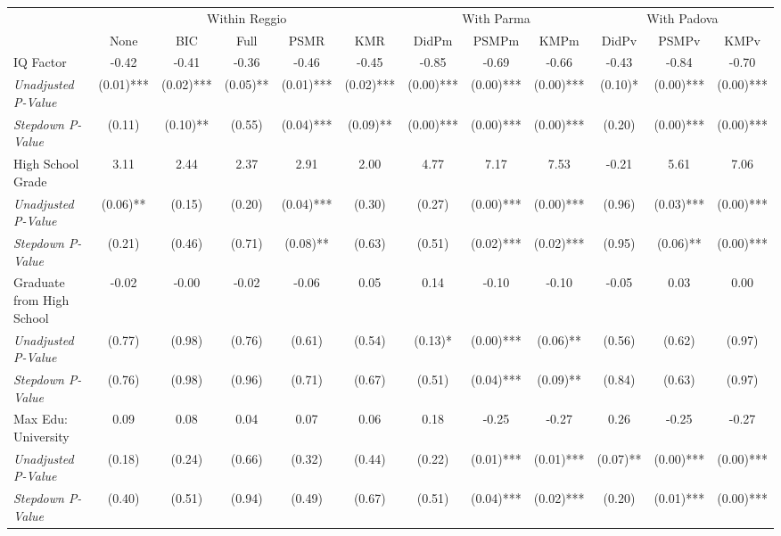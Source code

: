 \begin{tabular}{l c c c c c c c c c c c}
\toprule
& \multicolumn{5}{c}{Within Reggio} & \multicolumn{3}{c}{With Parma} & \multicolumn{3}{c}{With Padova} \\\cmidrule(lr){2-6} \cmidrule(lr){7-9} \cmidrule(lr){10-12}
 & None & BIC & Full & PSMR & KMR & DidPm & PSMPm & KMPm & DidPv & PSMPv & KMPv \\
\midrule
IQ Factor & -0.42 & -0.41 & -0.36 & -0.46 & -0.45 & -0.85 & -0.69 & -0.66 & -0.43 & -0.84 & -0.70 \\
\quad \textit{Unadjusted P-Value} & (0.01)*** & (0.02)*** & (0.05)** & (0.01)*** & (0.02)*** & (0.00)*** & (0.00)*** & (0.00)*** & (0.10)* & (0.00)*** & (0.00)*** \\
\quad \textit{Stepdown P-Value} & (0.11) & (0.10)** & (0.55) & (0.04)*** & (0.09)** & (0.00)*** & (0.00)*** & (0.00)*** & (0.20) & (0.00)*** & (0.00)*** \\
High School Grade & 3.11 & 2.44 & 2.37 & 2.91 & 2.00 & 4.77 & 7.17 & 7.53 & -0.21 & 5.61 & 7.06 \\
\quad \textit{Unadjusted P-Value} & (0.06)** & (0.15) & (0.20) & (0.04)*** & (0.30) & (0.27) & (0.00)*** & (0.00)*** & (0.96) & (0.03)*** & (0.00)*** \\
\quad \textit{Stepdown P-Value} & (0.21) & (0.46) & (0.71) & (0.08)** & (0.63) & (0.51) & (0.02)*** & (0.02)*** & (0.95) & (0.06)** & (0.00)*** \\
Graduate from High School & -0.02 & -0.00 & -0.02 & -0.06 & 0.05 & 0.14 & -0.10 & -0.10 & -0.05 & 0.03 & 0.00 \\
\quad \textit{Unadjusted P-Value} & (0.77) & (0.98) & (0.76) & (0.61) & (0.54) & (0.13)* & (0.00)*** & (0.06)** & (0.56) & (0.62) & (0.97) \\
\quad \textit{Stepdown P-Value} & (0.76) & (0.98) & (0.96) & (0.71) & (0.67) & (0.51) & (0.04)*** & (0.09)** & (0.84) & (0.63) & (0.97) \\
Max Edu: University & 0.09 & 0.08 & 0.04 & 0.07 & 0.06 & 0.18 & -0.25 & -0.27 & 0.26 & -0.25 & -0.27 \\
\quad \textit{Unadjusted P-Value} & (0.18) & (0.24) & (0.66) & (0.32) & (0.44) & (0.22) & (0.01)*** & (0.01)*** & (0.07)** & (0.00)*** & (0.00)*** \\
\quad \textit{Stepdown P-Value} & (0.40) & (0.51) & (0.94) & (0.49) & (0.67) & (0.51) & (0.04)*** & (0.02)*** & (0.20) & (0.01)*** & (0.00)*** \\
\bottomrule
\end{tabular}
